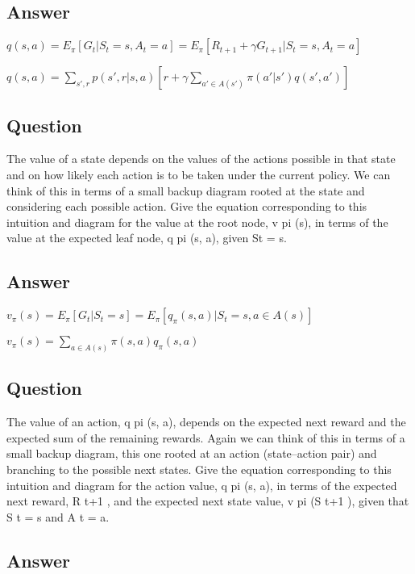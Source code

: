 \documentclass[11pt]{article}
\begin{document}
    \subsection*{Answer}

    $q(s, a) =  E_{\pi}[G_{t}|S_{t}=s, A_{t}=a] = E_{\pi}[R_{t+1} + \gamma G_{t+1}|S_{t}=s, A_{t}=a]$

    $q(s, a) =  \sum_{s',r} p(s',r | s, a) [r + \gamma \sum_{a' \in A(s')} \pi(a'|s')q(s', a') ] $

    \subsection{Question}

    The value of a state depends on the values of the actions possible in that state and on how likely each action is to be taken under the current policy.
    We can think of this in terms of a small backup diagram rooted at the state and considering each possible action.
    Give the equation corresponding to this intuition and diagram for the value at the root node, v pi (s), in terms of the value at the expected leaf node, q pi (s, a), given St = s.

    \subsection*{Answer}

    $v_{\pi}(s) = E_{\pi}[G_{t}|S_{t}=s] = E_{\pi}[q_{\pi}(s,a)|S_{t}=s, a \in A(s)] $

    $v_{\pi}(s) = \sum_{a \in A(s)} \pi(s, a) q_{\pi}(s,a) $

    \subsection{Question}

    The value of an action, q pi (s, a), depends on the expected next reward and the expected sum of the remaining rewards.
    Again we can think of this in terms of a small backup diagram, this one rooted at an action (state–action pair) and branching to the possible next states.
    Give the equation corresponding to this intuition and diagram for the action value, q pi (s, a), in terms of the expected next reward, R t+1 , and the expected next state value, v pi (S t+1 ), given that S t = s and A t = a.

    \subsection*{Answer}
\end{document}
